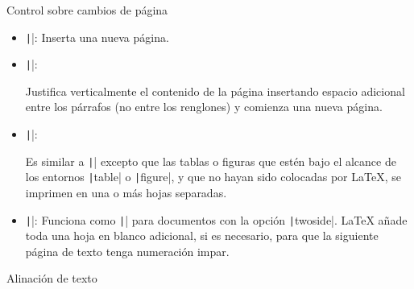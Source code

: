 \begin{frame}
	\frametitle{}

	\begin{block}{Control sobre cambios de página}
		\begin{itemize}
			\item

			      \texttt|\newpage|: Inserta una nueva página.

			\item

			      \texttt|\pagebreak|:

			      Justifica verticalmente el contenido de la página
			      insertando espacio adicional entre los párrafos
			      (no entre los renglones) y comienza una nueva página.

			\item

			      \texttt|\clearpage|:

			      Es similar a \texttt|\newpage| excepto que las
			      tablas o figuras que estén bajo el alcance de los
			      entornos \texttt|table| o
			      \texttt|figure|, y que no hayan sido colocadas
			      por \LaTeX{}, se imprimen en una o más hojas separadas.

			\item

			      \texttt|\cleardoublepage|:
			      Funciona como \texttt|\clearpage| para
			      documentos con la opción \texttt|twoside|.
			      \LaTeX{} añade toda una hoja en blanco adicional, si es
			      necesario, para que la siguiente página de texto tenga
			      numeración impar.
		\end{itemize}
	\end{block}

	\begin{block}{Alinación de texto}\end{block} %
\end{frame}

